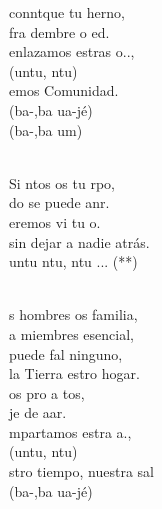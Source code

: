 \documentclass[12pt]{article}
\begin{document}
\begin{multicols*}{2}
\begin{cancion}
	 conntque tu herno, \\
	fra dembre o ed. \\
	 enlazamos estras o..,\\
	(untu, ntu)\\
	emos Comunidad.\\
	(ba-,ba ua-jé)\\
	(ba-,ba um)\\\jump\\
	\begin{chorus}%
	Si ntos os tu rpo,\\
	do se puede anr.\\
	eremos vi tu o. \\
sin dejar a nadie atrás.\\
	untu ntu, ntu ... (**)\\
	\end{chorus}%
	\jump\\
	s hombres os familia, \\
	a miembres esencial,\\
	 puede fal ninguno, \\
	la Tierra estro hogar.\\
	os pro a tos,\\
	je de aar.\\
	mpartamos estra a.,\\
	(untu, ntu)\\
	stro tiempo, nuestra sal \\
	(ba-,ba ua-jé)\\

\end{cancion}
\end{multicols*}
\end{document}
